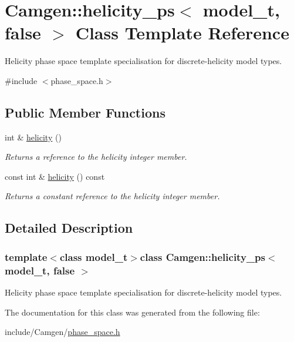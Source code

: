 \hypertarget{a00277}{}\section{Camgen\+:\+:helicity\+\_\+ps$<$ model\+\_\+t, false $>$ Class Template Reference}
\label{a00277}


Helicity phase space template specialisation for discrete-\/helicity model types.  




{\ttfamily \#include $<$phase\+\_\+space.\+h$>$}

\subsection*{Public Member Functions}
\begin{DoxyCompactItemize}
\item 
\hypertarget{a00277_a30035e4fc32fe666019a33379687585f}{}int \& \hyperlink{a00277_a30035e4fc32fe666019a33379687585f}{helicity} ()\label{a00277_a30035e4fc32fe666019a33379687585f}

\begin{DoxyCompactList}\small\item\em Returns a reference to the helicity integer member. \end{DoxyCompactList}\item 
\hypertarget{a00277_af69a86b9a4a4f9a9998451e4030dee10}{}const int \& \hyperlink{a00277_af69a86b9a4a4f9a9998451e4030dee10}{helicity} () const \label{a00277_af69a86b9a4a4f9a9998451e4030dee10}

\begin{DoxyCompactList}\small\item\em Returns a constant reference to the helicity integer member. \end{DoxyCompactList}\end{DoxyCompactItemize}


\subsection{Detailed Description}
\subsubsection*{template$<$class model\+\_\+t$>$class Camgen\+::helicity\+\_\+ps$<$ model\+\_\+t, false $>$}

Helicity phase space template specialisation for discrete-\/helicity model types. 



The documentation for this class was generated from the following file\+:\begin{DoxyCompactItemize}
\item 
include/\+Camgen/\hyperlink{a00718}{phase\+\_\+space.\+h}\end{DoxyCompactItemize}
